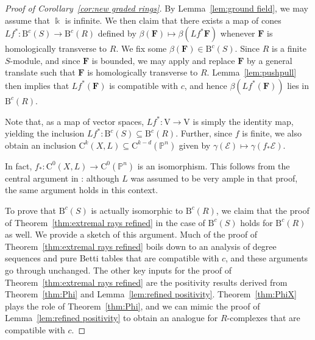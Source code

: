 \documentclass[12pt]{amsart}
\theoremstyle{definition}
\theoremstyle{remark}
\newcommand{\kk}{\Bbbk}
\newcommand{\PP}{\mathbb{P}}
\newcommand{\VV}{\mathrm{V}}
\newcommand{\cc}{c}
\newcommand{\cO}{\mathcal{O}}
\newcommand{\cE}{\mathcal{E}}
\newcommand{\cU}{\mathcal{U}}
\newcommand{\FF}{\mathbf{F}}
\newcommand{\CQ}{\mathrm{C}}
\newcommand{\BBQ}{\mathrm{B}}
\begin{document}
\begin{proof}[Proof of Corollary~\ref{cor:new graded rings}]
By Lemma~\ref{lem:ground field}, we may assume that $\kk$ is infinite.
We then claim that there exists a map of cones $Lf^*\colon \BBQ^{\cc}(S)\to \BBQ^{\cc}(R)$ defined by $\beta(\FF)\mapsto \beta(Lf^*\FF)$ whenever $\FF$ is homologically transverse to $R$.  We fix some $\beta(\FF)\in \BBQ^{\cc}(S)$.  Since $R$ is a finite $S$-module, and since $\FF$ is bounded, we may apply \cite[Theorem, p.\ 335]{miller-speyer} and replace $\FF$ by a general translate such that $\FF$ is homologically transverse to $R$.  Lemma~\ref{lem:pushpull} then implies that $Lf^*(\FF)$ is compatible with $c$, and hence $\beta(Lf^*(\FF))$ lies in $\BBQ^{\cc}(R)$.

Note that, as a map of vector spaces, $Lf^*\colon \VV\to \VV$ 
is simply the identity map, yielding the inclusion
$
Lf^*\colon \BBQ^{\cc}(S)\subseteq \BBQ^{\cc}(R).
$
Further, since $f$ is finite, we also obtain an inclusion $\CQ^k(X,L)\subseteq \CQ^{k-d}(\PP^n)$ given by $\gamma(\cE)\mapsto \gamma(f_*\cE)$.  

In fact, $f_*\colon \CQ^0(X,L)\to \CQ^{0}(\PP^n)$  is an isomorphism.  This follows from the central argument in
\cite[Proof of Theorem 5]{eis-schrey-abel}: although $L$ was assumed to be very ample in that proof, the same argument
holds in this context.

To prove that $\BBQ^{\cc}(S)$ is actually isomorphic to $\BBQ^{\cc}(R)$, we claim that the proof of Theorem~\ref{thm:extremal rays refined} in the case of $\BBQ^{\cc}(S)$ holds for $\BBQ^{\cc}(R)$ as well.  We provide a sketch of this argument.  Much of the proof of Theorem~\ref{thm:extremal rays refined} boils down to an analysis of degree sequences and pure Betti tables that are compatible with $\cc$, and these arguments go through unchanged.  The other key inputs for the proof of Theorem~\ref{thm:extremal rays refined} are the positivity results derived from Theorem~\ref{thm:Phi} and Lemma~\ref{lem:refined positivity}.  Theorem~\ref{thm:PhiX} plays the role of Theorem~\ref{thm:Phi}, and we can mimic the proof of Lemma~\ref{lem:refined positivity} to obtain an analogue for $R$-complexes that are compatible with $\cc$.  
\end{proof}
\end{document}
